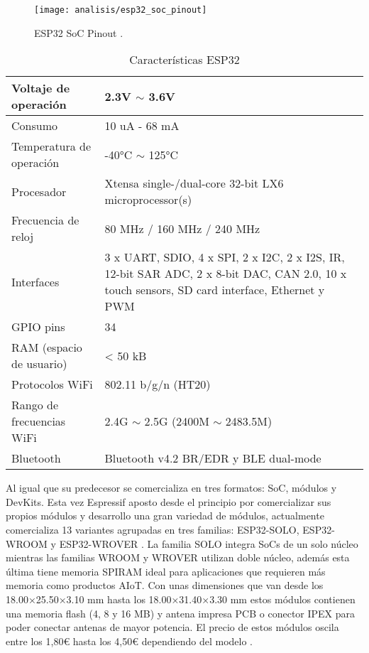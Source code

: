 \documentclass[../proyecto.tex]{subfiles}
\begin{document}
\begin{figure}[H]
\centering
\texttt{[image: analisis/esp32\_soc\_pinout]}
\caption{ESP32 SoC Pinout  \cite{esp32_soc_pinout}.}
\label{fig:esp32_soc_pinout}
\end{figure}

\begin{table}[h!]
\centering
\begin{tabular}{ |l|m{20em}| }
\hline
Voltaje de operación      & 2.3V $\sim$ 3.6V          \\ \hline
Consumo                   & 10 uA - 68 mA  \\ \hline
Temperatura de operación  & -40°C $\sim$ 125°C        \\ \hline
Procesador                & Xtensa single-/dual-core 32-bit LX6 microprocessor(s)   \\ \hline
Frecuencia de reloj       & 80 MHz / 160 MHz  / 240 MHz        \\ \hline
Interfaces                & 3 x UART, SDIO, 4 x SPI, 2 x I2C, 2 x I2S, IR, 12-bit SAR ADC, 2 x 8-bit DAC, CAN 2.0, 10 x touch sensors, SD card interface, Ethernet y PWM                           \\ \hline
GPIO pins                 & 34                        \\ \hline
RAM (espacio de usuario)  & < 50 kB                     \\ \hline
Protocolos WiFi           & 802.11 b/g/n (HT20)       \\ \hline
Rango de frecuencias WiFi & 2.4G $\sim$ 2.5G (2400M $\sim$ 2483.5M) \\ \hline
Bluetooth           &  Bluetooth v4.2 BR/EDR y BLE dual-mode  \\ \hline
\end{tabular}
\caption{Características ESP32}
\label{table:caracteristicas_esp32}
\end{table}

Al igual que su predecesor se comercializa en tres formatos: SoC, módulos y DevKits. Esta vez Espressif aposto desde el principio por comercializar sus propios módulos y desarrollo una gran variedad de módulos, actualmente comercializa 13 variantes agrupadas en tres familias: ESP32-SOLO, ESP32-WROOM y ESP32-WROVER \cite{espressif_products_ordering_information}. La familia SOLO integra SoCs de un solo núcleo mientras las familias WROOM y WROVER utilizan doble núcleo, además esta última tiene memoria SPIRAM ideal para aplicaciones que requieren más memoria como productos AIoT. Con unas dimensiones que van desde los 18.00×25.50×3.10 mm hasta los 18.00×31.40×3.30 mm estos módulos contienen una memoria flash (4, 8 y 16 MB) y antena impresa PCB o conector IPEX para poder conectar antenas de mayor potencia. El precio de estos módulos oscila entre los 1,80€ hasta los 4,50€ dependiendo del modelo \cite{espressif_provider_digikey} \cite{espressif_provider_mouser}.\\
\end{document}
